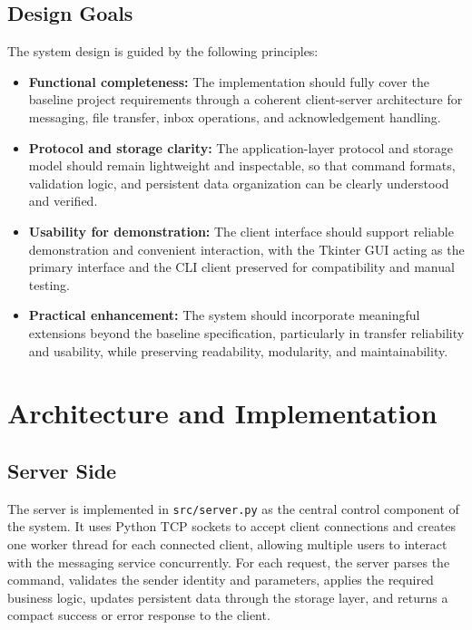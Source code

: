 \documentclass[conference]{IEEEtran}
\begin{document}
\subsection{Design Goals}
The system design is guided by the following principles:
\begin{itemize}
	\item \textbf{Functional completeness:} The implementation should fully cover the baseline project requirements through a coherent client-server architecture for messaging, file transfer, inbox operations, and acknowledgement handling.
	
	\item \textbf{Protocol and storage clarity:} The application-layer protocol and storage model should remain lightweight and inspectable, so that command formats, validation logic, and persistent data organization can be clearly understood and verified.
	
	\item \textbf{Usability for demonstration:} The client interface should support reliable demonstration and convenient interaction, with the Tkinter GUI acting as the primary interface and the CLI client preserved for compatibility and manual testing.
	
	\item \textbf{Practical enhancement:} The system should incorporate meaningful extensions beyond the baseline specification, particularly in transfer reliability and usability, while preserving readability, modularity, and maintainability.
\end{itemize}

\vspace*{0.5\baselineskip}
\section{Architecture and Implementation}
\subsection{Server Side}
The server is implemented in \texttt{src/server.py} as the central control component of the system. It uses Python TCP sockets to accept client connections and creates one worker thread for each connected client, allowing multiple users to interact with the messaging service concurrently. For each request, the server parses the command, validates the sender identity and parameters, applies the required business logic, updates persistent data through the storage layer, and returns a compact success or error response to the client.
\end{document}
